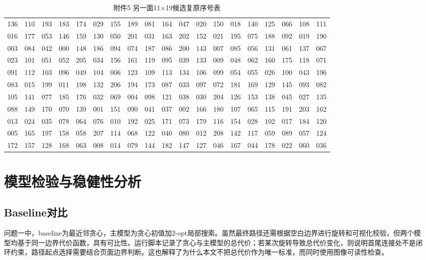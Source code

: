 \documentclass[UTF8,a4paper,12pt]{ctexart}
\begin{document}
\begin{longtable}{*{19}{c}}\caption{附件5 另一面11×19候选复原序号表}\label{tab:q3b}\\\toprule
136 & 110 & 193 & 183 & 174 & 029 & 155 & 189 & 081 & 164 & 047 & 020 & 150 & 018 & 140 & 125 & 066 & 108 & 111 \\
016 & 177 & 053 & 146 & 159 & 130 & 050 & 201 & 031 & 163 & 202 & 152 & 021 & 195 & 075 & 188 & 092 & 019 & 190 \\
003 & 084 & 042 & 000 & 148 & 186 & 094 & 074 & 187 & 086 & 200 & 143 & 007 & 085 & 056 & 131 & 061 & 137 & 067 \\
023 & 101 & 051 & 052 & 205 & 034 & 156 & 161 & 119 & 095 & 039 & 133 & 009 & 048 & 062 & 160 & 175 & 118 & 071 \\
091 & 112 & 103 & 096 & 049 & 104 & 006 & 123 & 109 & 113 & 134 & 106 & 099 & 054 & 055 & 026 & 100 & 043 & 196 \\
083 & 015 & 199 & 011 & 198 & 132 & 206 & 194 & 173 & 087 & 033 & 097 & 072 & 181 & 169 & 129 & 145 & 093 & 082 \\
105 & 141 & 077 & 185 & 176 & 032 & 069 & 004 & 098 & 121 & 038 & 030 & 204 & 126 & 153 & 138 & 045 & 027 & 135 \\
088 & 149 & 170 & 070 & 139 & 001 & 151 & 090 & 041 & 037 & 002 & 166 & 180 & 107 & 065 & 115 & 191 & 203 & 162 \\
013 & 024 & 035 & 078 & 064 & 076 & 010 & 192 & 025 & 171 & 073 & 179 & 116 & 154 & 028 & 102 & 017 & 184 & 120 \\
005 & 165 & 197 & 158 & 058 & 207 & 114 & 068 & 122 & 040 & 080 & 012 & 208 & 142 & 117 & 059 & 089 & 057 & 124 \\
172 & 157 & 128 & 168 & 063 & 008 & 014 & 079 & 144 & 182 & 147 & 127 & 046 & 167 & 044 & 178 & 022 & 060 & 036 \\
\bottomrule\end{longtable}

\section{模型检验与稳健性分析}
\subsection{Baseline对比}
问题一中，baseline为最近邻贪心，主模型为贪心初值加2-opt局部搜索。虽然最终路径还需根据空白边界进行旋转和可视化校验，但两个模型均基于同一边界代价函数，具有可比性。运行脚本记录了贪心与主模型的总代价；若某次旋转导致总代价变化，则说明首尾连接处不是闭环约束，路径起点选择需要结合页面边界判断。这也解释了为什么本文不把总代价作为唯一标准，而同时使用图像可读性检查。
\end{document}
